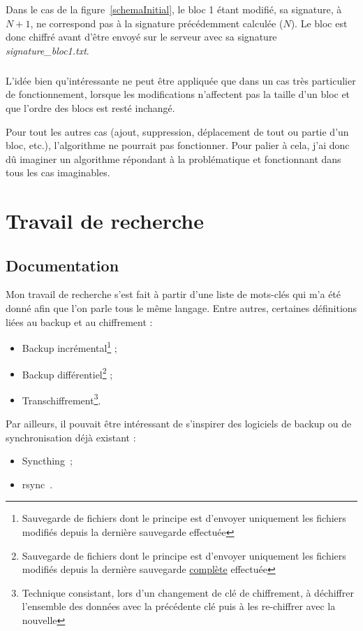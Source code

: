 \documentclass[a4paper,10pt, twoside]{report}
\begin{document}
\begin{spacing}{1.2}
Dans le cas de la figure~\ref{schemaInitial}, le bloc 1 étant modifié, sa
signature, à \(N + 1\), ne correspond pas à la signature précédemment calculée
(\(N\)). Le bloc est donc chiffré avant d'être envoyé sur le serveur avec sa
signature \textit{signature\_bloc1.txt}.

\subparagraph{}
L'idée bien qu'intéressante ne peut être appliquée que dans un cas très
particulier de fonctionnement, lorsque les modifications n'affectent pas la
taille d'un bloc et que l'ordre des blocs est resté inchangé.

Pour tout les autres cas (ajout, suppression, déplacement de tout ou partie
d'un bloc, etc.), l'algorithme ne pourrait pas fonctionner. Pour palier à
cela, j'ai donc dû imaginer un algorithme répondant à la problématique
et fonctionnant dans tous les cas imaginables.

\section{Travail de recherche}
\label{secTravailRecherche}
\subsection{Documentation}

Mon travail de recherche s'est fait à partir d'une liste de mots-clés qui
m'a été donné afin que l'on parle tous le même langage. Entre autres,
certaines définitions liées au backup et au chiffrement :
\begin{itemize}
 \item Backup incrémental\footnote{Sauvegarde de fichiers dont le principe est
 d'envoyer uniquement les fichiers modifiés depuis la dernière sauvegarde
 effectuée} ;
 \item Backup différentiel\footnote{Sauvegarde de fichiers dont le principe
 est d'envoyer uniquement les fichiers modifiés depuis la dernière
 sauvegarde \underline{complète} effectuée} ;
 \item Transchiffrement\footnote{Technique consistant, lors d'un changement
 de clé de chiffrement, à déchiffrer l'ensemble des données avec la
 précédente clé puis à les re-chiffrer avec la nouvelle}.
\end{itemize}

Par ailleurs, il pouvait être intéressant de s'inspirer des logiciels de backup
ou de synchronisation déjà existant :
\begin{itemize}
 \item Syncthing~\cite{refSyncthing};
 \item rsync~\cite{refRsync}.
\end{itemize}


\end{spacing}
\end{document}
